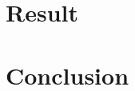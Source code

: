 \documentclass[conference]{IEEEtran}
\begin{document}
\section{Result}\label{Result}

%


\section{Conclusion}\label{Conclusion}

%




%






%
\end{document}
